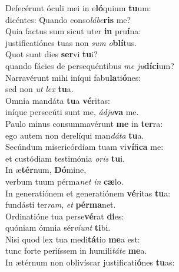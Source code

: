 \evenverse Defecérunt óculi mei in e\textbf{ló}quium \textbf{tu}um:~\*\\
\evenverse dicéntes: Quando conso\textit{lá}\textit{be}\textbf{ris} me?\\
\oddverse Quia factus sum sicut uter \textbf{in} pru\textbf{í}na:~\*\\
\oddverse justificatiónes tuas non \textit{sum} \textit{o}\textbf{blí}tus.\\
\evenverse Quot sunt dies \textbf{ser}vi \textbf{tu}i?~\*\\
\evenverse quando fácies de persequéntibus \textit{me} \textit{ju}\textbf{dí}\textbf{ci}um?\\
\oddverse Narravérunt mihi iníqui fabu\textbf{la}ti\textbf{ó}nes:~\*\\
\oddverse sed non \textit{ut} \textit{lex} \textbf{tu}a.\\
\evenverse Omnia mandáta \textbf{tu}a \textbf{vé}ritas:~\*\\
\evenverse iníque persecúti sunt me, \textit{ád}\textit{ju}\textbf{va} me.\\
\oddverse Paulo minus consummavérunt \textbf{me} in \textbf{ter}ra:~\*\\
\oddverse ego autem non derelíqui man\textit{dá}\textit{ta} \textbf{tu}a.\\
\evenverse Secúndum misericórdiam tuam vi\textbf{ví}fi\textbf{ca} me:~\*\\
\evenverse et custódiam testimónia \textit{o}\textit{ris} \textbf{tu}i.\\
\oddverse In æ\textbf{tér}num, \textbf{Dó}mine,~\*\\
\oddverse verbum tuum pérma\textit{net} \textit{in} \textbf{cæ}lo.\\
\evenverse In generatiónem et generatiónem \textbf{vé}ritas \textbf{tu}a:~\*\\
\evenverse fundásti ter\textit{ram}, \textit{et} \textbf{pér}\textbf{ma}net.\\
\oddverse Ordinatióne tua perse\textbf{vé}rat \textbf{di}es:~\*\\
\oddverse quóniam ómnia sér\textit{vi}\textit{unt} \textbf{ti}bi.\\
\evenverse Nisi quod lex tua medi\textbf{tá}tio \textbf{me}a est:~\*\\
\evenverse tunc forte periíssem in humili\textit{tá}\textit{te} \textbf{me}a.\\
\oddverse In ætérnum non oblivíscar justificati\textbf{ó}nes \textbf{tu}as:~\*\\
